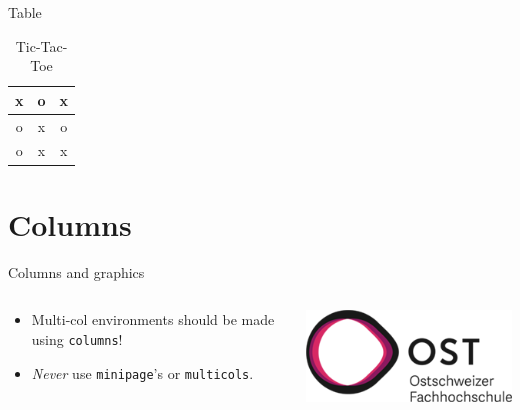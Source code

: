 \documentclass[aspectratio=169,envcountsect]{beamer}    %
\begin{document}
\begin{frame}{Table}
 \begin{table}[h]
  \centering
  \caption{Tic-Tac-Toe}\label{tab:tictactoe}
  {\Large
   \begin{tabular}{c|c|c}
    x & o & x \\\midrule
    o & x & o \\\midrule
    o & x & x \\
   \end{tabular}}
 \end{table}
\end{frame}

\section{Columns}
\begin{frame}{Columns and graphics}
	\begin{columns}[onlytextwidth]
  	\begin{column}{0.5\textwidth}
   		\begin{itemize}
    		\item Multi-col environments should be made using \texttt{columns}!
    		\item \emph{Never} use \texttt{minipage}'s or \texttt{multicols}.
   		\end{itemize}
  	\end{column}
  \begin{column}{0.5\textwidth}
  	\centering
   	\includegraphics[width=0.6\linewidth]{header/ost_logo}
  \end{column}
 \end{columns}
\end{frame}
%
\end{document}
